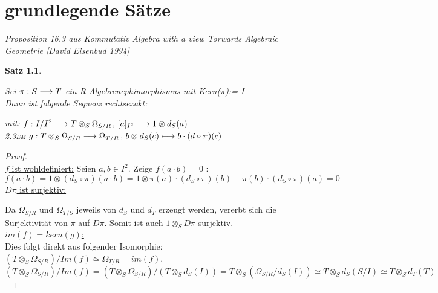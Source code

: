\documentclass[10pt,a4paper]{report}
\newcommand{\ModulsOfDifferenzials}{Kommutativ Algebra with a view Torwards Algebraic Geometrie [David Eisenbud 1994]}
\newcounter{Aussage}[chapter]
\newtheorem{satz}[Aussage]{Satz}
\newcommand{\functionfront}[3]{\nolinebreak{#1:#2 \longrightarrow #3}}
\newcommand{\function}[5]{\nolinebreak{#1:#2 \longrightarrow #3 \, , \, #4 \longmapsto #5}}
\newcommand{\divR}[2]{\Omega_{#1/#2}}
\newcommand{\Tensor}[3]{#1 \otimes_{#2} #3}
\newcommand{\tensor}[3]{#1 \otimes #3}
\newcommand{\kernel}[1]{kern(#1)}
\newcommand{\immage}[1]{im(#1)}
\begin{document}
\chapter{grundlegende Sätze}
\textit{Proposition 16.3 aus \ModulsOfDifferenzials}
\begin{satz} \label{prop16.3}
\raggedright
Sei $\functionfront{\pi}{S}{T}$ ein R-Algebrenephimorphismus mit Kern($\pi$):= I \\
Dann ist folgende Sequenz rechtsexakt: \\
\begin{center}
\end{center}
\begin{spacing}{1.5}
mit: $\function{f}{I/I^2}{{\Tensor{T}{S}{\divR{S}{R}}}}{[a]_{I^2}}{\tensor{1}{S}{d_S(a)}}$\\
\textsc{\leftskip2.3em} $\function{g}{\Tensor{T}{S}{\divR{S}{R}}}{\divR{T}{R}}{\tensor{b}{S}{d_S(c)}}{b \cdot (d \circ \pi)(c)}$
\end{spacing}
\end{satz}

\begin{proof} \ \\
\underline{$f$ ist wohldefiniert:} Seien $a,b\in I^2$. Zeige $f(a \cdot b)=0$ :
$$ f(a \cdot b) =
\tensor{1}{S}{( d_S \circ \pi )(a \cdot b)} =
\tensor{1}{S}{\pi(a) \cdot (d_S \circ \pi )(b) + \pi(b) \cdot ( d_S \circ \pi )(a)} =0$$
\underline{$D\pi$ ist surjektiv:}

\begin{center}
\end{center}
Da $\divR{S}{R}$ und $\divR{T}{S}$ jeweils von $d_S$ und $d_T$ erzeugt werden, vererbt sich die Surjektivität von $\pi$ auf $D\pi$. Somit ist auch $\Tensor{1}{S}{D\pi}$ surjektiv.\\
\underline{$\immage{f}=\kernel{g}$:}\\ Dies folgt direkt aus folgender Isomorphie: $(\Tensor{T}{S}{\divR{S}{R}})/Im(f) \simeq \divR{T}{R} = \immage{f}$.
$$(\Tensor{T}{S}{\divR{S}{R}})/Im(f) = (\Tensor{T}{S}{\divR{S}{R}})/(\Tensor{T}{S}{d_S(I)}) = \Tensor{T}{S}{(\divR{S}{R}/d_S(I))} \simeq \Tensor{T}{S}{d_S(S/I)} \simeq \Tensor{T}{S}{d_T(T)}$$
\end{proof}
\end{document}

